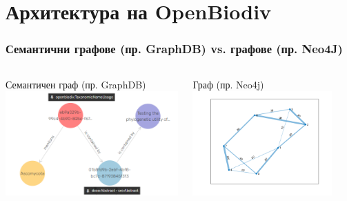 \documentclass[bulgarian]{beamer}
\begin{document}
\section{Архитектура на OpenBiodiv}
\begin{frame}
\frametitle{Семантични графове (пр. GraphDB) vs. графове (пр. Neo4J)}
\begin{columns}
\centering
Семантичен граф (пр. GraphDB)
\\
\includegraphics[height = 4cm, width=\textwidth]{Figures/tnu-vis}

\centering
Граф (пр. Neo4j)
\\
\includegraphics[height = 4cm, width=\textwidth]{Figures/labeled-graph}
\end{columns}
\end{frame}
\end{document}
